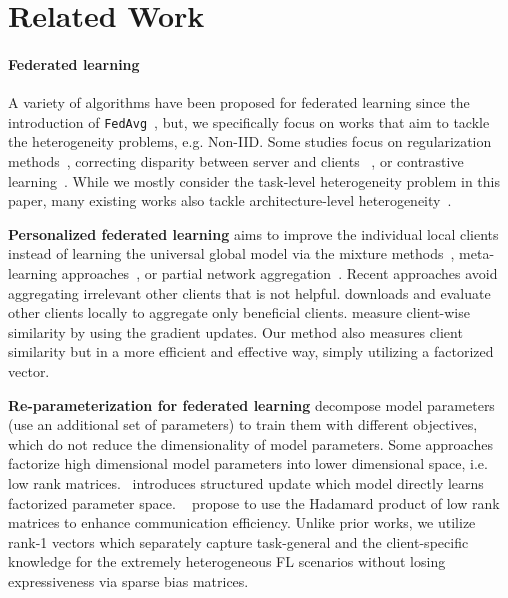 \vspace{-0.15in}
\section{Related Work}

\paragraph{Federated learning} A variety of algorithms have been proposed for federated learning since the introduction of \texttt{FedAvg}~\cite{McMahan2017CommunicationEfficientLO}, but, we specifically focus on works that aim to tackle the heterogeneity problems, e.g. Non-IID. Some studies focus on regularization methods~\citep{mohri2019agnostic,li2020federated}, correcting disparity between server and clients ~\cite{Wang2020Federated,karimireddy2021scaffold}, or contrastive learning~\citep{li2021modelcontrastive}. While we mostly consider the task-level heterogeneity problem in this paper, many existing works also tackle architecture-level heterogeneity~\citep{seo2020federated,zhu2021datafree,diao2021heterofl,shamsian2021personalized}.


\textbf{Personalized federated learning} aims to improve the individual local clients instead of learning the universal global model via the mixture methods~\citep{mansour2020approaches,deng2020adaptive,hanzely2021federated},   meta-learning approaches~\citep{fallah2020personalized}, or partial network aggregation~\citep{arivazhagan2019federated,liang2020think}. Recent approaches avoid aggregating irrelevant other clients that is not helpful. \citet{zhang2021personalized} downloads and evaluate other clients locally to aggregate only beneficial clients. \citet{sattler2019clustered,duan2021fedgroup} measure client-wise similarity by using the gradient updates. Our method also measures client similarity but in a more efficient and effective way, simply utilizing a factorized vector.

\textbf{Re-parameterization for federated learning} \citet{jeong2021federated,yoon2021federated} decompose model parameters (use an additional set of parameters) to train them with different objectives, which do not reduce the dimensionality of model parameters. Some approaches factorize high dimensional model parameters into lower dimensional space, i.e. low rank matrices.~\citet{konevcny2016federated} introduces structured update which model directly learns 
factorized parameter space. ~\citet{anonymous2022fedpara} propose to use the Hadamard product of low rank matrices to enhance communication efficiency. Unlike prior works, we utilize rank-1 vectors which separately capture task-general and the client-specific knowledge for the extremely heterogeneous FL scenarios without losing expressiveness via sparse bias matrices. 

